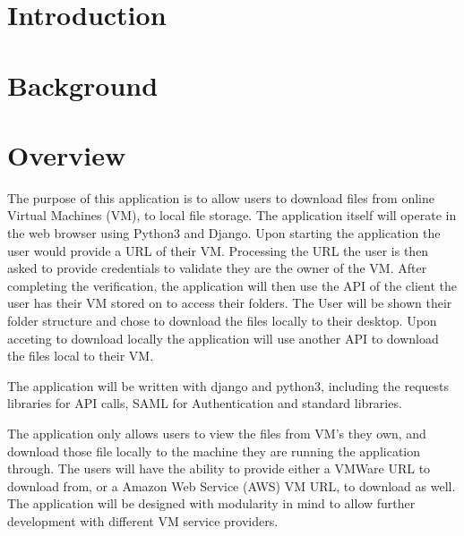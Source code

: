\documentclass{article}
\title{}
\author{}
\date{}
\begin{document}
    

    \tableofcontents
    \listoffigures

    \newpage
    \begin{versionhistory}
    \end{versionhistory}
    \newpage

    \section{Introduction}
		
    \section{Background}

    \section{Overview}
    The purpose of this application is to allow users to download files from online Virtual Machines (VM), to local file storage.
    The application itself will operate in the web browser using Python3 and Django. Upon starting the application the user would
    provide a URL of their VM. Processing the URL the user is then asked to provide credentials to validate they are the owner of
    the VM. After completing the verification, the application will then use the API of the client the user has their VM stored on
    to access their folders. The User will be shown their folder structure and chose to download the files locally to their desktop.
    Upon acceting to download locally the application will use another API to download the files local to their VM.

    The application will be written with django and python3, including the requests libraries for API calls, SAML for Authentication
    and standard libraries.

    The application only allows users to view the files from VM's they own, and download those file locally to the machine they 
    are running the application through. The users will have the ability to provide either a VMWare URL to download from, or a 
    Amazon Web Service (AWS) VM URL, to download as well. The application will be designed with modularity in mind to allow further 
    development with different VM service providers.  
\end{document}
